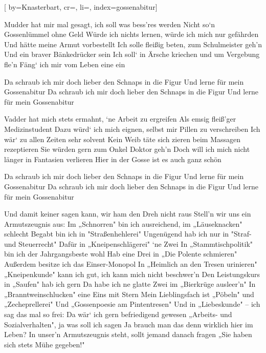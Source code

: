 

[%
    by={Knasterbart},
    cr={},
    li={},
    index={gossenabitur}]


    \label{gossenabitur}

    \beginverse\memorize[verse]
        Mudder hat mir mal gesagt, ich soll was bess'res werden
        Nicht so‘n Gossenlümmel ohne Geld
        Würde ich nichts lernen, würde ich mich nur gefährden
        Und hätte meine Armut vorbestellt
        Ich solle fleißig beten, zum Schulmeister geh'n
        Und ein braver Bänkedrücker sein
        Ich soll‘ in Ärsche kriechen und um Vergebung fle'n
        Fäng‘ ich mir vom Leben eine ein
    \endverse

    \beginchorus\memorize[chorus]
        Da schraub ich mir doch lieber den Schnaps in die Figur
        Und lerne für mein Gossenabitur
        Da schraub ich mir doch lieber den Schnaps in die Figur
        Und lerne für mein Gossenabitur
    \endchorus

    \beginverse\replay[verse]
        Vadder hat mich stets ermahnt, ‘ne Arbeit zu ergreifen
        Als emsig fleiß'ger Medizinstudent
        Dazu würd‘ ich mich eignen, selbst mir Pillen zu verschreiben
        Ich wär‘ zu allen Zeiten sehr solvent
        Kein Weib täte sich zieren beim Massagen rezeptieren
        Sie würden gern zum Onkel Doktor geh'n
        Doch will ich mich nicht länger in Fantasien verlieren
        Hier in der Gosse ist es auch ganz schön
    \endverse

    \beginchorus\replay[chorus]
        Da schraub ich mir doch lieber den Schnaps in die Figur
        Und lerne für mein Gossenabitur
        Da schraub ich mir doch lieber den Schnaps in die Figur
        Und lerne für mein Gossenabitur
    \endchorus

    \beginverse\replay[verse]
        Und damit keiner sagen kann, wir ham den Dreh nicht raus
        Stell'n wir uns ein Armutszeugnis aus:
        Im „Schnorren" bin ich ausreichend, im „Läuseknacken" schlecht
        Begabt bin ich in "Straßenhehlerei"
        Ungenügend hab ich nur in "Straf- und Steuerrecht"
        Dafür in „Kneipenschlägerei" ‘ne Zwei
        In „Stammtischpolitik" bin ich der Jahrgangsbeste wohl
        Hab eine Drei in „Die Polente schmieren"
        Außerdem besitze ich das Einser-Monopol
        In „Heimlich an den Tresen urinieren"
        „Kneipenkunde" kann ich gut, ich kann mich nicht beschwer'n
        Den Leistungskurs in „Saufen" hab ich gern
        Da habe ich ne glatte Zwei im „Bierkrüge ausleer'n"
        In „Branntweinschlucken" eine Eins mit Stern
        Mein Lieblingsfach ist „Pöbeln" und „Zecheprellerei"
        Und „Gossenpoesie am Pintentresen"
        Und in „Liebeskunde" – ich sag das mal so frei:
        Da wär‘ ich gern befriedigend gewesen
        „Arbeits- und Sozialverhalten", ja was soll ich sagen
        Ja brauch man das denn wirklich hier im Leben?
        In unser'n Armutszeugnis steht, sollt jemand danach fragen
        „Sie haben sich stets Mühe gegeben!"
    \endverse

